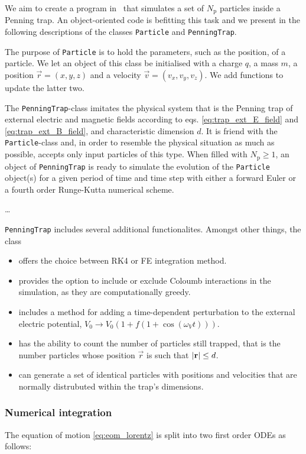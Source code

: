 We aim to create a program in \CC\, that simulates a set of $N_\mathrm{p}$ particles inside a Penning trap. An object-oriented code is befitting this task and we present in the following descriptions of the classes \verb|Particle| and \verb|PenningTrap|.

The purpose of \texttt{Particle} is to hold the parameters, such as the position, of a particle. We let an object of this class be initialised with a charge $q$, a mass $m$, a position $\vec{r} = (x,y,z)$ and a velocity $\vec{v} = (v_x, v_y, v_z)$. We add functions to update the latter two. 

The \texttt{PenningTrap}-class imitates the physical system that is the Penning trap of external electric and magnetic fields according to eqs. \eqref{eq:trap_ext_E_field} and \eqref{eq:trap_ext_B_field}, and characteristic dimension $d$. It is friend with the \texttt{Particle}-class and, in order to resemble the physical situation as much as possible, accepts only input particles of this type. When filled with $N_\mathrm{p}\geq 1$, an object of \texttt{PenningTrap} is ready to simulate the evolution of the \texttt{Particle} object(s) for a given period of time and time step with either a forward Euler or a fourth order Runge-Kutta numerical scheme. 
 

\dots


\texttt{PenningTrap} includes several additional functionalites. Amongst other things, the class

\begin{itemize}
    \item offers the choice between RK4 or FE integration method.
    \item provides the option to include or exclude Coloumb interactions in the simulation, as they are computationally greedy.
    \item includes a method for adding a time-dependent perturbation to the external electric potential, $V_0\rightarrow V_0 (1+ f(1+\cos{(\omega_V t)}))$.
    \item has the ability to count the number of particles still trapped, that is the number particles whose position $\vec{r}$ is such that $\abs{\mathbf{r}} \leq d$.
    \item can generate a set of identical particles with positions and velocities that are normally distrubuted within the trap's dimensions.
\end{itemize}

\subsubsection*{Numerical integration}
The equation of motion \eqref{eq:eom_lorentz} is split into two first order ODEs as follows:

